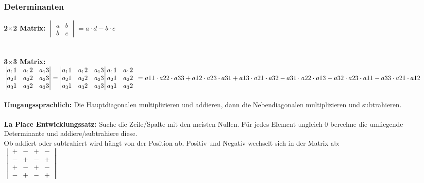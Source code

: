 \documentclass[6pt,a4paper]{scrartcl}
\begin{document}
\begin{multicols*}{3}
\subsubsection{Determinanten}
\textbf{2$\times$2 Matrix:} $\begin{vmatrix}
a & b \\
b & c
\end{vmatrix} = a \cdot d - b \cdot c$
\\
\\
\\
\textbf{3$\times$3 Matrix:} $
\begin{vmatrix}
a_11 & a_12 & a_13 \\
a_21 & a_22 & a_23 \\
a_31 & a_32 & a_33 \\
\end{vmatrix}
=
\begin{vmatrix}
a_11 & a_12 & a_13 \\
a_21 & a_22 & a_23 \\
a_31 & a_32 & a_33 \\
\end{vmatrix}
\begin{matrix}
a_11 & a_12 \\
a_21 & a_22 \\
a_31 & a_32 \\
\end{matrix}
\\
\\
= a11 \cdot a22 \cdot a33 + a12 \cdot a23 \cdot a31 + a13 \cdot a21 \cdot a32 - a31 \cdot a22 \cdot a13 - a32 \cdot a23 \cdot a11 - a33 \cdot a21 \cdot a12
$
\\
\\
\textbf{Umgangssprachlich:} Die Hauptdiagonalen multiplizieren und addieren, dann die Nebendiagonalen multiplizieren und subtrahieren.
\\
\\
\textbf{La Place Entwicklungssatz:} Suche die Zeile/Spalte mit den meisten Nullen. Für jedes Element ungleich 0 berechne die umliegende Determinante und addiere/subtrahiere diese.\\
Ob addiert oder subtrahiert wird hängt von der Position ab. Positiv und Negativ wechselt sich in der Matrix ab:\\
$
\begin{vmatrix}
+ & - & + & - \\
- & + & - & + \\
+ & - & + & - \\
- & + & - & +
\end{vmatrix}
$

\end{multicols*}
\end{document}
